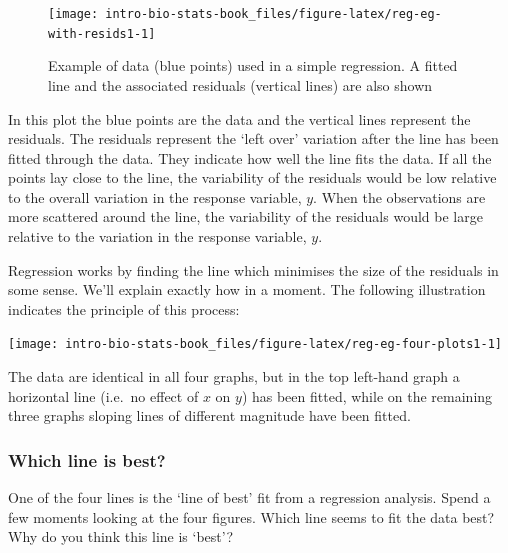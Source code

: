 \documentclass[
]{book}
\newenvironment{greybox}{
  \definecolor{shadecolor}{rgb}{0.95,0.95,0.95}  %
  \color{black}
  \begin{shaded}}
 {\end{shaded}}
\newenvironment{infobox}[1]
  {
  \begin{itemize}
  \renewcommand{\labelitemi}{
    \raisebox{-.7\height}[0pt][0pt]{
      {\setkeys{Gin}{width=3em,keepaspectratio}
        \texttt{[image: images/\#1]}}
    }
  }
  \setlength{\fboxsep}{1em}
  \begin{greybox}
  \item
  }
  {
  \end{greybox}
  \end{itemize}
  }
\begin{document}
\begin{figure}

{\centering \texttt{[image: intro-bio-stats-book\_files/figure-latex/reg-eg-with-resids1-1]} 

}

\caption{Example of data (blue points) used in a simple regression. A fitted line and the associated residuals (vertical lines) are also shown}\label{fig:reg-eg-with-resids1}
\end{figure}

In this plot the blue points are the data and the vertical lines represent the residuals. The residuals represent the `left over' variation after the line has been fitted through the data. They indicate how well the line fits the data. If all the points lay close to the line, the variability of the residuals would be low relative to the overall variation in the response variable, \(y\). When the observations are more scattered around the line, the variability of the residuals would be large relative to the variation in the response variable, \(y\).

Regression works by finding the line which minimises the size of the residuals in some sense. We'll explain exactly how in a moment. The following illustration indicates the principle of this process:

\begin{center}\texttt{[image: intro-bio-stats-book\_files/figure-latex/reg-eg-four-plots1-1]} \end{center}

The data are identical in all four graphs, but in the top left-hand graph a horizontal line (i.e.~no effect of \(x\) on \(y\)) has been fitted, while on the remaining three graphs sloping lines of different magnitude have been fitted.

\begin{infobox}{action}

\hypertarget{which-line-is-best}{%
\subsubsection*{Which line is best?}\label{which-line-is-best}}

One of the four lines is the `line of best' fit from a regression analysis. Spend a few moments looking at the four figures. Which line seems to fit the data best? Why do you think this line is `best'?

\end{infobox}
\end{document}
